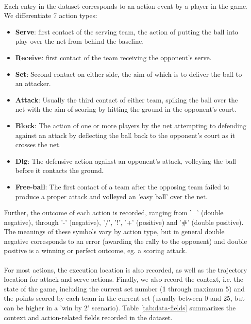 \documentclass{sfuthesis}
\begin{document}
	\\Each entry in the dataset corresponds to an action event by a player in the game. We differentiate 7 action types:
	\begin{itemize}
		\item \textbf{Serve}: first contact of the serving team, the action of putting the ball into play over the net from behind the baseline.
		\item \textbf{Receive}: first contact of the team receiving the opponent's serve.
		\item \textbf{Set}: Second contact on either side, the aim of which is to deliver the ball to an attacker.
		\item \textbf{Attack}: Usually the third contact of either team, spiking the ball over the net with the aim of scoring by hitting the ground in the opponent's court.
		\item \textbf{Block}: The action of one or more players by the net attempting to defending against an attack by deflecting the ball back to the opponent's court as it crosses the net.
		\item \textbf{Dig}: The defensive action against an opponent's attack, volleying the ball before it contacts the ground.
		\item \textbf{Free-ball}: The first contact of a team after the opposing team failed to produce a proper attack and volleyed an 'easy ball' over the net.
	\end{itemize}
	Further, the outcome of each action is recorded, ranging from '=' (double negative), through '-' (negative), '/', '!', '+' (positive) and '\#' (double positive). The meanings of these symbols vary by action type, but in general double negative corresponds to an error (awarding the rally to the opponent) and double positive is a winning or perfect outcome, eg. a scoring attack.\\\\
	For most actions, the execution location is also recorded, as well as the trajectory location for attack and serve actions. Finally, we also record the context, i.e. the state of the game, including the current set number (1 through maximum 5) and the points scored by each team in the current set (usually between 0 and 25, but can be higher in a 'win by 2' scenario). Table \ref{tab:data-fields} summarizes the context and action-related fields recorded in the dataset.
\end{document}
